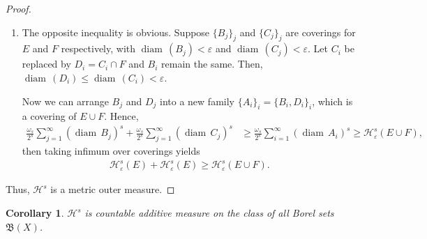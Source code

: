 \documentclass[11pt]{book}
\newtheorem{corollary}{Corollary}[theorem]
\theoremstyle{definition}
\numberwithin{equation}{chapter}
\def\diam{{\operatorname{diam}\,}}
\begin{document}
\begin{proof}
\begin{enumerate}[label=(\alph*)]
\begin{enumerate}[label=\arabic*)]
        \item The opposite inequality is obvious. Suppose $\{B_j\}_j$ and $\{C_j\}_j$ are coverings for $E$ and $F$ respectively, with $\diam(B_j) < \varepsilon$ and $\diam(C_j) < \varepsilon$. Let $C_i$ be replaced by $D_i = C_i \cap F$ and $B_i$ remain the same. Then, $\diam(D_i) \leq \diam(C_i) < \varepsilon$.
        
        Now we can arrange $B_j$ and $D_j$ into a new family $\{A_i\}_i = \{B_i, D_i\}_i$, which is a covering of $E \cup F$. Hence,
        \begin{align*}
            \frac{\omega_s}{2^s} \sum^\infty_{j=1} \left(\diam B_j\right)^s + \frac{\omega_s}{2^s} \sum^\infty_{j=1} \left(\diam C_j\right)^s & \geq \frac{\omega_s}{2^s} \sum^\infty_{i=1} \left(\diam A_i\right)^s \geq \mathcal{H}^s_\varepsilon(E \cup F),
        \end{align*}
        then taking infimum over coverings yields
        \begin{align*}
            \mathcal{H}^s_\varepsilon(E) + \mathcal{H}^s_\varepsilon(E) \geq \mathcal{H}^s_\varepsilon(E \cup F).
        \end{align*}
    \end{enumerate}
\end{enumerate}
Thus, $\mathcal{H}^s$ is a metric outer measure.
\end{proof}

\medskip

\begin{corollary}\label{coro_1111}
$\mathcal{H}^s$ is countable additive measure on the class of all Borel sets $\mathfrak{B}(X)$.
\end{corollary}

\medskip
\end{document}
